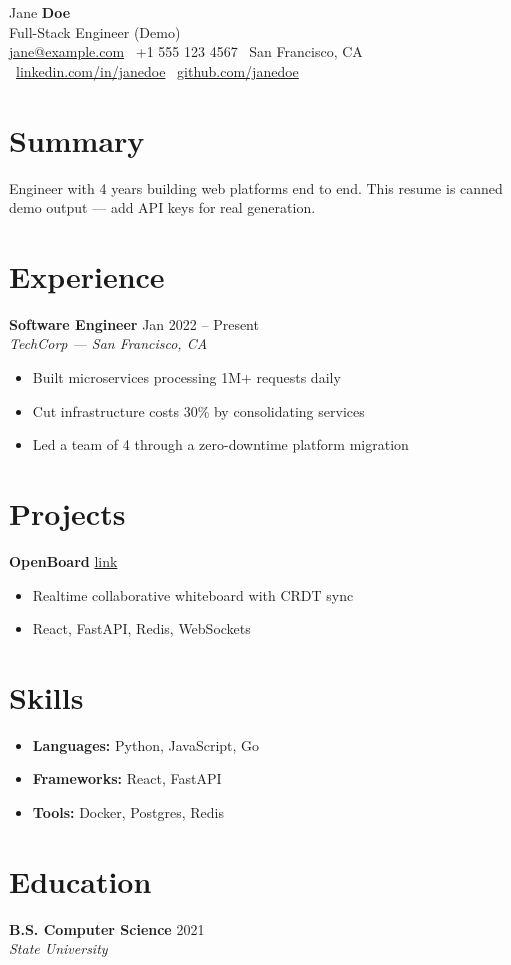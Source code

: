 \documentclass[10pt,a4paper]{article}
\begin{document}
\begin{center}
  {\Huge Jane {\bfseries\color{awesome}Doe}}\\[4pt]
  {\small\color{darktext} Full-Stack Engineer (Demo)}\\[6pt]
  {\footnotesize
    \href{mailto:jane@example.com}{jane@example.com} \textbar\
    +1 555 123 4567 \textbar\ San Francisco, CA \textbar\
    \href{https://linkedin.com/in/janedoe}{linkedin.com/in/janedoe} \textbar\
    \href{https://github.com/janedoe}{github.com/janedoe}}
\end{center}

\section{Summary}
Engineer with 4 years building web platforms end to end. This resume is canned demo output --- add API keys for real generation.

\section{Experience}
\textbf{Software Engineer} \hfill {\color{awesome}\small Jan 2022 -- Present}\\
{\small\itshape TechCorp — San Francisco, CA}
\begin{itemize}[leftmargin=*,nosep,itemsep=2pt]
  \item Built microservices processing 1M+ requests daily
  \item Cut infrastructure costs 30\% by consolidating services
  \item Led a team of 4 through a zero-downtime platform migration
\end{itemize}

\section{Projects}
\textbf{OpenBoard} \hfill {\color{awesome}\small \href{https://github.com/janedoe/openboard}{link}}
\begin{itemize}[leftmargin=*,nosep,itemsep=2pt]
  \item Realtime collaborative whiteboard with CRDT sync
  \item React, FastAPI, Redis, WebSockets
\end{itemize}

\section{Skills}
\begin{itemize}[leftmargin=*,nosep,itemsep=2pt]
  \item \textbf{Languages:} Python, JavaScript, Go
  \item \textbf{Frameworks:} React, FastAPI
  \item \textbf{Tools:} Docker, Postgres, Redis
\end{itemize}

\section{Education}
\textbf{B.S. Computer Science} \hfill {\color{awesome}\small 2021}\\
{\small\itshape State University}
\end{document}
